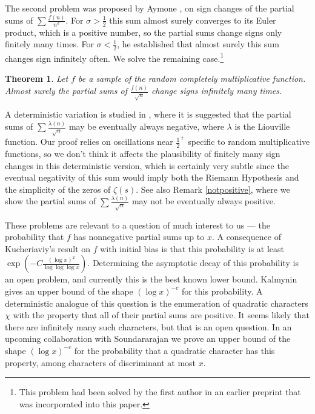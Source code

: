 \documentclass[12pt]{amsart}
\newtheorem{theorem}{Theorem}[section]
\theoremstyle{remark}
\theoremstyle{definition}
\theoremstyle{remark}
\numberwithin{equation}{section}
\begin{document}
The second problem was proposed by Aymone \cite{aymone2024ii}, on sign changes of the partial sums of $\sum\frac{f(n)}{n^{\sigma}}$. For $\sigma > \frac{1}{2}$ this sum almost surely converges to its Euler product, which is a positive number, so the partial sums change signs only finitely many times. For $\sigma < \frac{1}{2}$, he established that almost surely this sum changes sign infinitely often. We solve the remaining case.\footnote{This problem had been solved by the first author in an earlier preprint that was incorporated into this paper.}



\begin{theorem}\label{thm: sign changes}
    Let $f$ be a sample of the random completely multiplicative function. Almost surely the partial sums of $\frac{f(n)}{\sqrt{n}}$ change signs infinitely many times. 
\end{theorem}

A deterministic variation is studied in \cite{betweenpolyaandturan}, where it is suggested that the partial sums of $\sum \frac{\lambda(n)}{\sqrt{n}}$ may be eventually always negative, where $\lambda$ is the Liouville function.  Our proof relies on oscillations near $\frac{1}{2}^{+}$ specific to random multiplicative functions, so we don't think it affects the plausibility of finitely many sign changes in this deterministic version, which is certainly very subtle since the eventual negativity of this sum would imply both the Riemann Hypothesis and the simplicity of the zeros of $\zeta(s)$. See also Remark \ref{notpositive}, where we show the partial sums of $\sum \frac{\lambda(n)}{\sqrt{n}}$ may not be eventually always positive.

These problems are relevant to a question of much interest to us --- the probability that $f$ has nonnegative partial sums up to $x$.  A consequence of Kucheriaviy's result on $f$ with initial bias is that this probability is at least $\exp(-C\frac{(\log x)^2}{\log \log \log x})$.  Determining the asymptotic decay of this probability is an open problem, and currently this is the best known lower bound. Kalmynin \cite{kal2021} gives an upper bound of the shape $(\log x)^{-c}$ for this probability. A deterministic analogue of this question is the enumeration of quadratic characters $\chi$ with the property that all of their partial sums are positive. It seems likely that there are infinitely many such characters, but that is an open question. In an upcoming collaboration with Soundararajan \cite{ASX} we prove an upper bound of the shape $(\log x)^{-c}$ for the probability that a quadratic character has this property, among characters of discriminant at most $x$.
\end{document}
